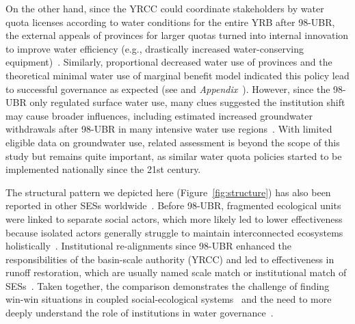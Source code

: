 On the other hand, since the YRCC could coordinate stakeholders by water quota licenses according to water conditions for the entire YRB after 98-UBR, the external appeals of provinces for larger quotas turned into internal innovation to improve water efficiency (e.g., drastically increased water-conserving equipment)~\cite{krieger1955, ostrom1990}.
Similarly, proportional decreased water use of provinces and the theoretical minimal water use of marginal benefit model indicated this policy lead to successful governance as expected (see  and \textit{Appendix~}).
However, since the 98-UBR only regulated surface water use, many clues suggested the institution shift may cause broader influences, including estimated increased groundwater withdrawals after 98-UBR in many intensive water use regions~\cite{sun2022b}.
With limited eligible data on groundwater use, related assessment is beyond the scope of this study but remains quite important, as similar water quota policies started to be implemented nationally since the 21st century.

The structural pattern we depicted here (Figure~\ref{fig:structure}) has also been reported in other SESs worldwide~\cite{kluger2020,guerrero2015,bodin2012}.
Before 98-UBR, fragmented ecological units were linked to separate social actors, which more likely led to lower effectiveness because isolated actors generally struggle to maintain interconnected ecosystems holistically~\cite{sayles2017,sayles2019,cai2016,bergsten2019}.
Institutional re-alignments since 98-UBR enhanced the responsibilities of the basin-scale authority (YRCC) and led to effectiveness in runoff restoration, which are usually named scale match or institutional match of SESs~\cite{cumming2020a,wang2019d}.
Taken together, the comparison demonstrates the challenge of finding win-win situations in coupled social-ecological systems~\cite{hegwood2022} and the need to more deeply understand the role of institutions in water governance~\cite{bergsten2019, sayles2019}.


